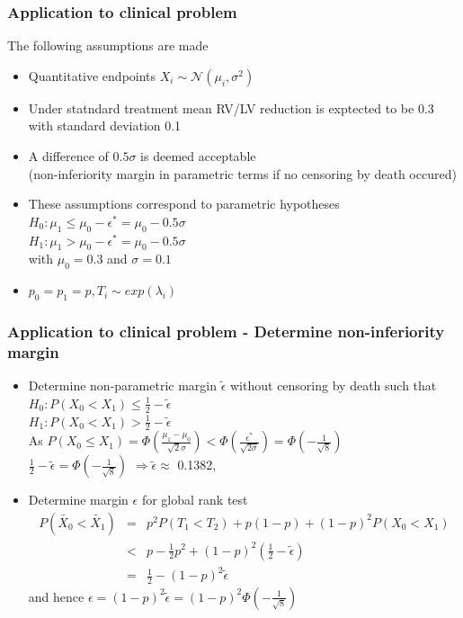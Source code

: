 \documentclass[xcolor=pdftex,dvipsnames,table]{beamer}\usepackage[]{graphicx}\usepackage[]{color}
\begin{document}
\begin{frame} %
\frametitle{Application to clinical problem}
The following assumptions are made
\begin{itemize}
  \item Quantitative endpoints $X_i \sim \mathcal{N} ( \mu_i, \sigma^2 ) $
  \item Under statndard treatment mean RV/LV reduction is exptected to be 0.3 with standard deviation 0.1
  \item A difference of $0.5 \sigma$ is deemed acceptable \\
        (non-inferiority margin in parametric terms if no censoring by death occured)
  \item These assumptions correspond to parametric hypotheses \\
        $H_0: \mu_1 \leq \mu_0 - \epsilon^{*}  = \mu_0 - 0.5 \sigma $\\
        $H_1: \mu_1 > \mu_0 - \epsilon^{*} = \mu_0 - 0.5 \sigma $ \\
        with $\mu_0 = 0.3$ and $\sigma = 0.1$
  \item $p_0 = p_1 = p, T_i \sim exp(\lambda_i)$
\end{itemize}
\end{frame}

\begin{frame}[fragile] %
\frametitle{Application to clinical problem - Determine non-inferiority margin}
\begin{itemize}
\item Determine non-parametric margin $\tilde{\epsilon}$ without censoring by death such that\\
        $H_0: P(X_0 < X_1) \leq \frac{1}{2} - \tilde{\epsilon}$ \\
        $H_1: P(X_0 < X_1) > \frac{1}{2} - \tilde{\epsilon}$ \\
        As $P(X_0 \leq X_1) = \Phi(\frac{\mu_1 - \mu_0}{\sqrt{2}\sigma}) < \Phi(\frac{\epsilon^{*}}{\sqrt{2\sigma}}) = \Phi(-\frac{1}{\sqrt{8}}) $ \\
      $\frac{1}{2} - \tilde{\epsilon} = \Phi(-\frac{1}{\sqrt{8}}) $ 
      $\Rightarrow \tilde{\epsilon} \approx $ 0.1382, \item Determine margin $\epsilon$ for global rank test
\begin{eqnarray*}
P(\tilde{X_0}  < \tilde{X_1}) & = & p^2 P(T_1 < T_2) + p(1-p) + (1 - p)^2 P(X_0 < X_1) \\
& < & p - \frac{1}{2}p^2 + (1-p)^2 (\frac{1}{2} - \tilde{\epsilon}) \\
& = & \frac{1}{2} - (1-p)^2 \tilde{\epsilon}
\end{eqnarray*}
and hence $\epsilon = (1-p)^2 \tilde{\epsilon} = (1-p)^2 \Phi(-\frac{1}{\sqrt{8}})$
\end{itemize}
\end{frame}
\end{document}
